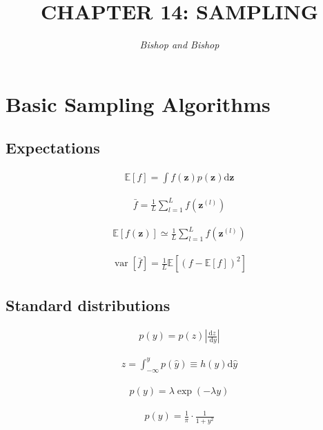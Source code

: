 \documentclass{article}
\title{\LARGE\scshape\MakeUppercase{Chapter 14: Sampling}}
\author{\textit{Bishop and Bishop}}
\date{}
\begin{document}
\maketitle

\section{Basic Sampling Algorithms}

\subsection{Expectations}

\begin{align*}
\mathbb{E}[f] =\int f(\mathbf{z}) p(\mathbf{z}) \mathrm{d} \mathbf{z} 
\tag{14.1}
\end{align*}

\begin{align*}
\bar{f}=\frac{1}{L} \sum_{l=1}^{L} f\left(\mathbf{z}^{(l)}\right)
\tag{14.2}
\end{align*}

\begin{align*}
\mathbb{E}[
f(\mathbf{z})]
\simeq \frac{1}{L} \sum_{l=1}^{L} f\left(\mathbf{z}^{(l)}\right)
\tag{14.3}
\end{align*}

\begin{align*}
\operatorname{var}[
\bar{f}]
=\frac{1}{L} \mathbb{E}\left[
(f-\mathbb{E}[
f]
)^{2}\right]
\tag{14.4}
\end{align*}

\subsection{Standard distributions}

\begin{align*}
p(y)=p(z)\left|\frac{\mathrm{d} z}{\mathrm{~d} y}\right|
\tag{14.5}
\end{align*}

\begin{align*}
z=\int_{-\infty}^{y} p(\widehat{y}) \equiv h(y) \mathrm{d} \widehat{y}
\tag{14.6}
\end{align*}

\begin{align*}
p(y)=\lambda \exp (-\lambda y)
\tag{14.7}
\end{align*}

\begin{align*}
p(y)=\frac{1}{\pi} \cdot \frac{1}{1+y^{2}}
\tag{14.8}
\end{align*}
\end{document}
